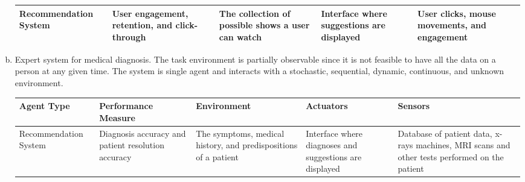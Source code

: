 \documentclass{math}
\begin{document}
\begin{enumerate}[(a)]
\begin{center}
\begin{tabular}{|p{3cm}|p{4cm}|p{3cm}|p{3cm}|p{3cm}|}
      \hline
      Recommendation System &
        User engagement, retention, and click-through &
        The collection of possible shows a user can watch &
        Interface where suggestions are displayed &
        User clicks, mouse movements, and engagement \\
      \hline
    \end{tabular}
  \end{center}
  \item Expert system for medical diagnosis. The task environment is partially
  observable since it is not feasible to have all the data on a person at any
  given time. The system is single agent and interacts with a stochastic,
  sequential, dynamic, continuous, and unknown environment.
  \begin{center}
    \begin{tabular}{|p{3cm}|p{4cm}|p{3cm}|p{3cm}|p{3cm}|}
      \hline
      Agent Type & Performance Measure & Environment & Actuators & Sensors \\
      \hline
      Recommendation System &
        Diagnosis accuracy and patient resolution accuracy &
        The symptoms, medical history, and predispositions of a patient &
        Interface where diagnoses and suggestions are displayed &
        Database of patient data, x-rays machines, MRI scans and other tests
        performed on the patient \\
      \hline
    \end{tabular}
  \end{center}
\end{enumerate}
\end{document}
